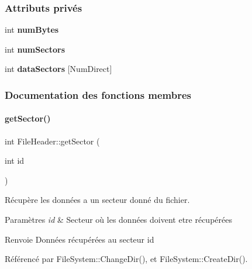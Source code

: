 \subsubsection*{Attributs privés}
\begin{DoxyCompactItemize}
\item 
\hypertarget{class_file_header_a8ce2c3a2c0eb628a60120acecf8a225b}{}\label{class_file_header_a8ce2c3a2c0eb628a60120acecf8a225b} 
int {\bfseries num\+Bytes}
\item 
\hypertarget{class_file_header_ab18c90cd87cf858a00b65bc7023cc28e}{}\label{class_file_header_ab18c90cd87cf858a00b65bc7023cc28e} 
int {\bfseries num\+Sectors}
\item 
\hypertarget{class_file_header_aa9ca0b73f5c5cac7821c4c919db43ccf}{}\label{class_file_header_aa9ca0b73f5c5cac7821c4c919db43ccf} 
int {\bfseries data\+Sectors} \mbox{[}Num\+Direct\mbox{]}
\end{DoxyCompactItemize}


\subsubsection{Documentation des fonctions membres}
\hypertarget{class_file_header_acd6d2c54e660c15dbfb4d367f722f88d}{}\label{class_file_header_acd6d2c54e660c15dbfb4d367f722f88d} 
\paragraph{\texorpdfstring{get\+Sector()}{getSector()}}
{\footnotesize\ttfamily int File\+Header\+::get\+Sector (\begin{DoxyParamCaption}\item[{int}]{id }\end{DoxyParamCaption})}



Récupère les données a un secteur donné du fichier. 


\begin{DoxyParams}{Paramètres}
{\em id} & Secteur où les données doivent etre récupérées \\
\hline
\end{DoxyParams}
\begin{DoxyReturn}{Renvoie}
Données récupérées au secteur id 
\end{DoxyReturn}


Référencé par File\+System\+::\+Change\+Dir(), et File\+System\+::\+Create\+Dir().

